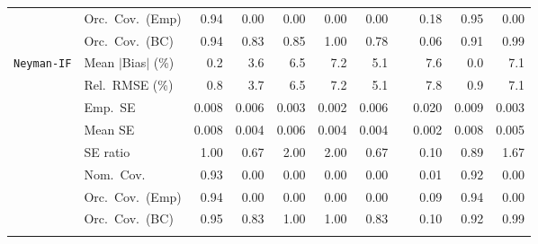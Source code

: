 \begin{landscape}
\begin{longtable}{llrrrrrrrrr}
 & Orc.\ Cov.\ (Emp) & \cellcolor{ranktwo}0.94 & 0.00 & 0.00 & 0.00 & 0.00 &  & \cellcolor{rankthree}0.18 & \cellcolor{rankone}0.95 & 0.00 \\
 & Orc.\ Cov.\ (BC) & \cellcolor{rankone}0.94 & 0.83 & 0.85 & \cellcolor{rankthree}1.00 & 0.78 &  & 0.06 & \cellcolor{ranktwo}0.91 & \cellcolor{ranktwo}0.99 \\
\addlinespace[2pt]
\quad \texttt{Neyman-IF} & Mean $|$Bias$|$ (\%) & \cellcolor{ranktwo}0.2 & \cellcolor{rankthree}3.6 & 6.5 & 7.2 & 5.1 &  & 7.6 & \cellcolor{rankone}0.0 & 7.1 \\
 & Rel.\ RMSE (\%) & \cellcolor{rankone}0.8 & \cellcolor{rankthree}3.7 & 6.5 & 7.2 & 5.1 &  & 7.8 & \cellcolor{ranktwo}0.9 & 7.1 \\
 & Emp.\ SE & 0.008 & 0.006 & 0.003 & 0.002 & 0.006 &  & 0.020 & 0.009 & 0.003 \\
 & Mean SE & 0.008 & 0.004 & 0.006 & 0.004 & 0.004 &  & 0.002 & 0.008 & 0.005 \\
 & SE ratio & \cellcolor{rankone}1.00 & \cellcolor{rankthree}0.67 & 2.00 & 2.00 & \cellcolor{rankthree}0.67 &  & 0.10 & \cellcolor{ranktwo}0.89 & 1.67 \\
 & Nom.\ Cov. & \cellcolor{rankone}0.93 & 0.00 & 0.00 & 0.00 & 0.00 &  & \cellcolor{rankthree}0.01 & \cellcolor{ranktwo}0.92 & 0.00 \\
 & Orc.\ Cov.\ (Emp) & \cellcolor{rankone}0.94 & \cellcolor{rankthree}0.00 & \cellcolor{rankthree}0.00 & \cellcolor{rankthree}0.00 & \cellcolor{rankthree}0.00 &  & \cellcolor{ranktwo}0.09 & \cellcolor{rankone}0.94 & \cellcolor{rankthree}0.00 \\
 & Orc.\ Cov.\ (BC) & \cellcolor{rankone}0.95 & 0.83 & 1.00 & 1.00 & 0.83 &  & 0.10 & \cellcolor{ranktwo}0.92 & \cellcolor{rankthree}0.99 \\
\addlinespace[2pt]
\end{longtable}
\end{landscape}
